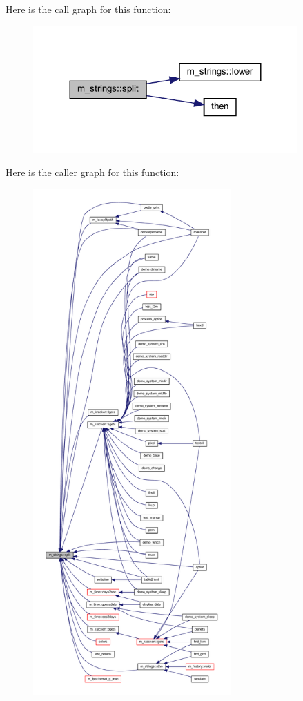 Here is the call graph for this function\+:
\nopagebreak
\begin{figure}[H]
\begin{center}
\leavevmode
\includegraphics[width=287pt]{namespacem__strings_a3f0119fab962146c7656cad592dd9acd_cgraph}
\end{center}
\end{figure}
Here is the caller graph for this function\+:
\nopagebreak
\begin{figure}[H]
\begin{center}
\leavevmode
\includegraphics[height=550pt]{namespacem__strings_a3f0119fab962146c7656cad592dd9acd_icgraph}
\end{center}
\end{figure}
\mbox{\label{namespacem__strings_af3767887ce5c2373a6d9061ea6664bfc}} 
